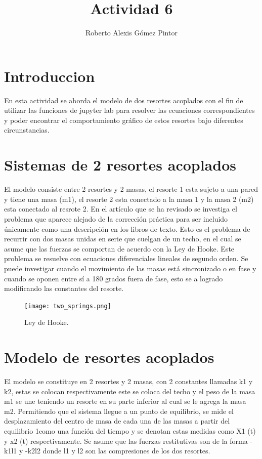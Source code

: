 \documentclass{article}
\title{Actividad 6}
\author{Roberto Alexis Gómez Pintor}
\begin{document}
\maketitle
\section{Introduccion}
En esta actividad se aborda el modelo de dos resortes acoplados con el fin de
utilizar las funciones de jupyter lab para resolver las ecuaciones correspondientes
y poder encontrar el comportamiento gráfico de estos resortes bajo diferentes
circunstancias.
\section{Sistemas de 2 resortes acoplados}
El modelo consiste entre 2 resortes y 2 masas, el resorte 1 esta sujeto a una pared y tiene una masa (m1), el resorte 2 esta conectado a la masa 1 y la masa 2 (m2) esta conectado al resrote 2. En el artículo que se ha revisado se investiga el problema que aparece alejado de la corrección práctica para ser incluido únicamente como una descripción en los libros de texto. Esto es el problema de recurrir con dos masas unidas en serie que cuelgan de un techo, en el cual se asume que las fuerzas se comportan de acuerdo con la Ley de Hooke. Este problema se resuelve con ecuaciones diferenciales lineales de segundo orden. Se puede investigar cuando el movimiento de las masas está sincronizado o en fase y cuando se oponen entre sí a 180 grados fuera de fase, esto se a logrado modificando las constantes del resorte.
\begin{figure}[!ht]
\centering
\texttt{[image: two\_springs.png]}
  \caption{Ley de Hooke.}
\end{figure}
\section{Modelo de resortes acoplados}
El modelo se constituye en 2 resortes y 2 masas, con 2 constantes llamadas k1 y k2, estas se colocan respectivamente este se coloca del techo y el peso de la masa
m1 se une teniendo un resorte en su parte inferior al cual se le agrega la masa
m2. Permitiendo que el sistema llegue a un punto de equilibrio, se mide el
desplazamiento del centro de masa de cada una de las masas a partir del equilibrio
1como una función del tiempo y se denotan estas medidas como X1 (t) y x2 (t)
respectivamente. Se asume que las fuerzas restitutivas son de la forma -k1l1 y -k2l2 donde l1 y l2 son las compresiones de los dos resortes.
\end{document}
